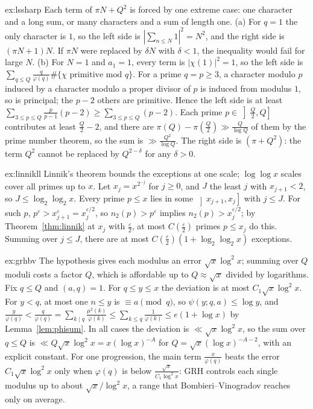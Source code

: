\begin{solution}{ex:lssharp}
\idea Each term of $\pi N+Q^2$ is forced by one extreme case: one character and a long sum, or many characters and a sum of length one.
\writeup (a) For $q=1$ the only character is $1$, so the left side is $|\sum_{n\le N}1|^2=N^2$, and the right side is $(\pi N+1)N$. If $\pi N$ were replaced by $\delta N$ with $\delta<1$, the inequality would fail for large $N$.
(b) For $N=1$ and $a_1=1$, every term is $|\chi(1)|^2=1$, so the left side is $\sum_{q\le Q}\frac q{\varphi(q)}\#\{\chi\text{ primitive mod }q\}$. For a prime $q=p\ge3$, a character modulo $p$ induced by a character modulo a proper divisor of $p$ is induced from modulus $1$, so is principal; the $p-2$ others are primitive. Hence the left side is at least $\sum_{3\le p\le Q}\frac p{p-1}(p-2)\ge\sum_{3\le p\le Q}(p-2)$. Each prime $p\in\left]\frac Q2,Q\right]$ contributes at least $\frac Q2-2$, and there are $\pi(Q)-\pi(\frac Q2)\gg\frac Q{\log Q}$ of them by the prime number theorem, so the sum is $\gg\frac{Q^2}{\log Q}$. The right side is $(\pi+Q^2)$: the term $Q^2$ cannot be replaced by $Q^{2-\delta}$ for any $\delta>0$.
\end{solution}

\begin{solution}{ex:linnikll}
\idea Linnik's theorem bounds the exceptions at one scale; $\log\log x$ scales cover all primes up to $x$.
\writeup Let $x_j=x^{2^{-j}}$ for $j\ge0$, and $J$ the least $j$ with $x_{j+1}<2$, so $J\le\log_2\log_2x$. Every prime $p\le x$ lies in some $\left]x_{j+1},x_j\right]$ with $j\le J$. For such $p$, $p^\varepsilon>x_{j+1}^\varepsilon=x_j^{\varepsilon/2}$, so $n_2(p)>p^\varepsilon$ implies $n_2(p)>x_j^{\varepsilon/2}$; by Theorem~\ref{thm:linnik} at $x_j$ with $\frac\varepsilon2$, at most $C(\frac\varepsilon2)$ primes $p\le x_j$ do this. Summing over $j\le J$, there are at most $C(\frac\varepsilon2)(1+\log_2\log_2x)$ exceptions.
\end{solution}

\begin{solution}{ex:grhbv}
\idea The hypothesis gives each modulus an error $\sqrt x\log^2x$; summing over $Q$ moduli costs a factor $Q$, which is affordable up to $Q\approx\sqrt x$ divided by logarithms.
\writeup Fix $q\le Q$ and $(a,q)=1$. For $q\le y\le x$ the deviation is at most $C_1\sqrt x\log^2x$. For $y<q$, at most one $n\le y$ is $\equiv a\pmod q$, so $\psi(y;q,a)\le\log y$, and $\frac y{\varphi(q)}<\frac q{\varphi(q)}=\sum_{k\mid q}\frac{\mu^2(k)}{\varphi(k)}\le\sum_{k\le q}\frac1{\varphi(k)}\le e(1+\log x)$ by Lemma~\ref{lem:phisum}. In all cases the deviation is $\ll\sqrt x\log^2x$, so the sum over $q\le Q$ is $\ll Q\sqrt x\log^2x=x(\log x)^{-A}$ for $Q=\sqrt x(\log x)^{-A-2}$, with an explicit constant.
For one progression, the main term $\frac x{\varphi(q)}$ beats the error $C_1\sqrt x\log^2x$ only when $\varphi(q)$ is below $\frac{\sqrt x}{C_1\log^2x}$: GRH controls each single modulus up to about $\sqrt x/\log^2x$, a range that Bombieri--Vinogradov reaches only on average.
\end{solution}

